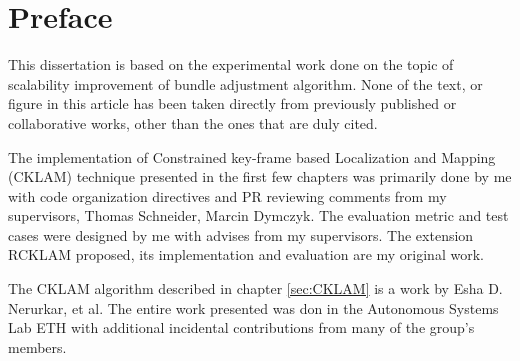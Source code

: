 \chapter*{Preface}

This dissertation is based on the experimental work done on the topic of scalability improvement of bundle adjustment algorithm. None of the text, or figure in this article has been  taken directly from previously published or collaborative works, other than the ones that are duly cited.

The implementation of Constrained key-frame based Localization and Mapping (CKLAM) technique presented in the first few chapters was primarily done by me with code organization directives and PR reviewing comments from my supervisors, Thomas Schneider, Marcin Dymczyk. The evaluation metric and test cases were designed by me with advises from my supervisors. The extension RCKLAM proposed, its implementation and evaluation are my original work.

The CKLAM algorithm described in chapter \ref{sec:CKLAM} is a work by Esha D. Nerurkar, et al. The entire work presented was don in the Autonomous Systems Lab ETH with additional incidental contributions from many of the group’s members.